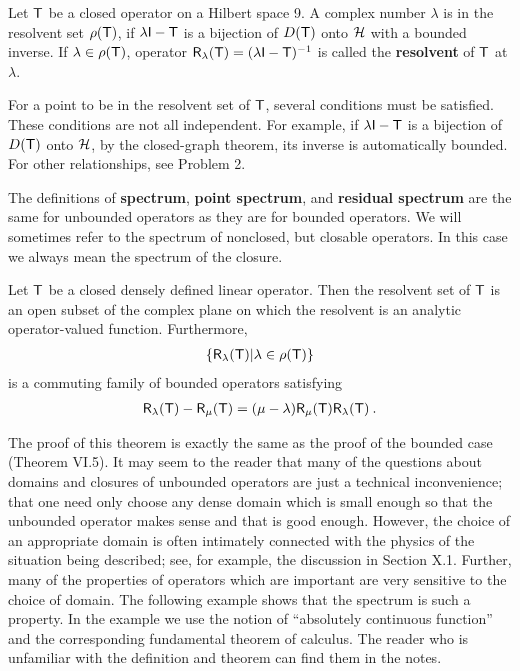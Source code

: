 \begin{definition}
Let $\mathsf{T}$ be a closed operator on a Hilbert space 9. A complex number $\lambda$ is in the resolvent set $\rho(\mathsf{T})$, if $ \lambda \mathsf{I} - \mathsf{T}$ is a bijection of $D(\mathsf{T})$ onto $\mathcal{H}$ with a bounded inverse. If $\lambda \in \rho(\mathsf{T})$, operator $\mathsf{R}_\lambda(\mathsf{T}) = (\lambda \mathsf{I} - \mathsf{T})^{-1}$ is called the \textbf{resolvent} of $\mathsf{T}$
at $\lambda$.
\end{definition}

For a point to be in the resolvent set of $\mathsf{T}$, several conditions must be satisfied. These conditions are not all independent. For example, if $ \lambda \mathsf{I} - \mathsf{T}$ is a bijection of $D(\mathsf{T})$ onto $\mathcal{H}$, by the closed-graph theorem, its inverse is automatically bounded. For other relationships, see Problem 2.

The definitions of \textbf{spectrum}, \textbf{point spectrum}, and \textbf{residual spectrum} are the same for unbounded operators as they are for bounded operators. We will sometimes refer to the spectrum of nonclosed, but closable operators. In this case we always mean the spectrum of the closure.

\begin{theorem}
Let $\mathsf{T}$ be a closed densely defined linear operator. Then
the resolvent set of $\mathsf{T}$ is an open subset of the complex plane on which the resolvent is an analytic operator-valued function. Furthermore,
\begin{align}
    \left \lbrace \mathsf{R}_\lambda (\mathsf{T}) | \lambda \in \rho(\mathsf{T}) \right \rbrace
\end{align}
is a commuting family of bounded operators satisfying
\begin{align}
   \mathsf{R}_\lambda(\mathsf{T}) - \mathsf{R}_\mu (\mathsf{T}) = (\mu - \lambda) \mathsf{R}_\mu (\mathsf{T}) \mathsf{R}_\lambda (\mathsf{T}) \:. 
\end{align}

\end{theorem}

The proof of this theorem is exactly the same as the proof of the bounded
case (Theorem VI.5).
It may seem to the reader that many of the questions about domains and closures of unbounded operators are just a technical inconvenience; that one need only choose any dense domain which is small enough so that the unbounded operator makes sense and that is good enough. However, the choice of an appropriate domain is often intimately connected with the physics of the situation being described; see, for example, the discussion in Section X.1.
Further, many of the properties of operators which are important are very sensitive to the choice of domain. The following example shows that the spectrum is such a property. In the example we use the notion of \enquote{absolutely continuous function} and the corresponding fundamental theorem of calculus. The reader who is unfamiliar with the definition and theorem can find them in the notes.

